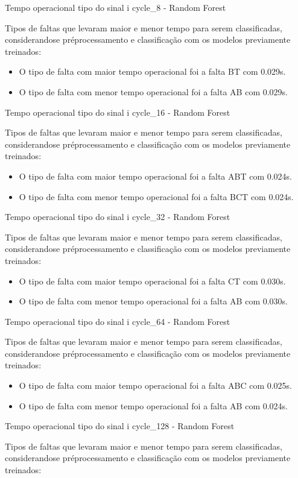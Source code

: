 Tempo operacional tipo do sinal i cycle_8 - Random Forest
\item Tipos de faltas que levaram maior e menor tempo para serem classificadas, considerando\hyph se pré\hyph processamento e classificação com os modelos previamente treinados:
\begin{itemize}
\item O tipo de falta com maior tempo operacional foi a falta BT com 0.029s.
\item O tipo de falta com menor tempo operacional foi a falta AB com 0.029s.
\end{itemize}
Tempo operacional tipo do sinal i cycle_16 - Random Forest
\item Tipos de faltas que levaram maior e menor tempo para serem classificadas, considerando\hyph se pré\hyph processamento e classificação com os modelos previamente treinados:
\begin{itemize}
\item O tipo de falta com maior tempo operacional foi a falta ABT com 0.024s.
\item O tipo de falta com menor tempo operacional foi a falta BCT com 0.024s.
\end{itemize}
Tempo operacional tipo do sinal i cycle_32 - Random Forest
\item Tipos de faltas que levaram maior e menor tempo para serem classificadas, considerando\hyph se pré\hyph processamento e classificação com os modelos previamente treinados:
\begin{itemize}
\item O tipo de falta com maior tempo operacional foi a falta CT com 0.030s.
\item O tipo de falta com menor tempo operacional foi a falta AB com 0.030s.
\end{itemize}
Tempo operacional tipo do sinal i cycle_64 - Random Forest
\item Tipos de faltas que levaram maior e menor tempo para serem classificadas, considerando\hyph se pré\hyph processamento e classificação com os modelos previamente treinados:
\begin{itemize}
\item O tipo de falta com maior tempo operacional foi a falta ABC com 0.025s.
\item O tipo de falta com menor tempo operacional foi a falta AB com 0.024s.
\end{itemize}
Tempo operacional tipo do sinal i cycle_128 - Random Forest
\item Tipos de faltas que levaram maior e menor tempo para serem classificadas, considerando\hyph se pré\hyph processamento e classificação com os modelos previamente treinados:
